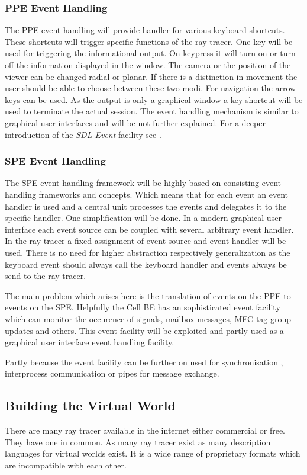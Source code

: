 \documentclass[DIV10, abstracton, openright, footsepline, headsepline, twoside, 9pt,
bigheadings]{scrreprt}
\begin{document}
\subsubsection*{PPE Event Handling}
The PPE event handling will provide handler for various keyboard shortcuts. These
shortcuts will trigger specific functions of the ray tracer. One key will be
used for triggering the informational output. On keypress it will turn on
or turn off the information displayed in the window. The camera or the position
of the viewer can be changed radial or planar. If there is a distinction in
 movement the user should be able to choose between these two modi. For navigation
 the arrow keys can be used. As the output is only a graphical window a key shortcut
 will be used to terminate the actual session. The event handling mechanism is similar
to graphical user interfaces and will be not further explained. For a deeper
introduction of the \textit{SDL Event} facility see \cite{SDL06}.


\subsubsection*{SPE Event Handling}
The SPE event handling framework will be highly based on consisting event
handling frameworks and concepts. Which means that for each event an event
handler is used and a central unit processes the events and delegates it
to the specific handler. One simplification will be done. In a modern
graphical user interface each event source can be coupled with several
arbitrary event handler. In the ray tracer a fixed assignment of event
source and event handler will be used. There is no need for higher abstraction
respectively generalization as the keyboard event should always call
the keyboard handler and events always be send to the ray tracer.

The main problem which arises here is the translation of events on the PPE
to events on the SPE. Helpfully the Cell BE has an sophisticated event
facility which can monitor the occurence of signals, mailbox  messages,
MFC tag-group updates and others. This event facility will be exploited
and partly used as a graphical user interface event handling facility.

Partly because the event facility can be further on used for synchronisation
,  interprocess communication or pipes for message exchange.

\subsection{Building the Virtual World}
There are many ray tracer available in the internet either commercial or free.
They have one in common. As many ray tracer exist as many description
languages for virtual worlds exist. It is a wide range of proprietary formats
which are incompatible with each other.
\end{document}
